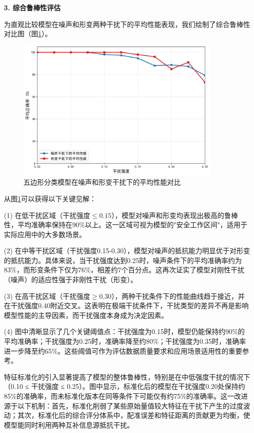 \textbf{3. 综合鲁棒性评估}

为直观比较模型在噪声和形变两种干扰下的平均性能表现，我们绘制了综合鲁棒性对比图（图\ref{fig:robustness_comparison1}）。

\begin{figure}[H]
    \centering
    \includegraphics[width=0.9\textwidth]{figures/robustness/pentagon_average_robustness_comparison.png}
    \caption{五边形分类模型在噪声和形变干扰下的平均性能对比}
    \label{fig:robustness_comparison1}
\end{figure}

从图\ref{fig:robustness_comparison1}可以获得以下关键见解：

(1) 在低干扰区域（干扰强度$\leq 0.15$），模型对噪声和形变均表现出极高的鲁棒性，平均准确率保持在90\%以上。这一区域可视为模型的"安全工作区间"，适用于实际应用中的大多数场景。

(2) 在中等干扰区域（干扰强度0.15-0.30），模型对噪声的抵抗能力明显优于对形变的抵抗能力。具体来说，当干扰强度达到0.25时，噪声条件下的平均准确率约为83\%，而形变条件下仅为76\%，相差约7个百分点。这再次证实了模型对刚性干扰（噪声）的适应性强于非刚性干扰（形变）。

(3) 在高干扰区域（干扰强度$\geq 0.30$），两种干扰条件下的性能曲线趋于接近，并在干扰强度0.40附近交叉。这表明在极端干扰条件下，干扰类型的差异不再是影响模型性能的主导因素，而干扰强度本身成为决定因素。

(4) 图中清晰显示了几个关键阈值点：干扰强度为0.15时，模型仍能保持约90\%的平均准确率；干扰强度为0.25时，准确率降至约80\%；干扰强度为0.35时，准确率进一步降至约65\%。这些阈值可作为评估数据质量要求和应用场景适用性的重要参考。

特征标准化的引入显著提高了模型的整体鲁棒性，特别是在中低强度干扰的情况下（0.10 ≤ 干扰强度 ≤ 0.25）。图中显示，标准化后的模型在干扰强度0.20处保持约85\%的准确率，而未标准化版本在同等条件下可能仅有约75\%的准确率。这一改进源于以下机制：首先，标准化削弱了某些原始量值较大特征在干扰下产生的过度波动；其次，标准化后的综合评分体系中，配准误差和特征距离的贡献更为均衡，使模型能同时利用两种互补信息源抵抗干扰。